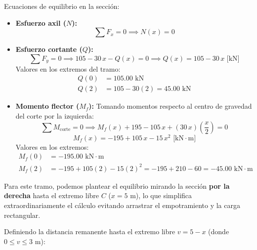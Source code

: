 Ecuaciones de equilibrio en la sección:
\begin{itemize}
    \item \textbf{Esfuerzo axil ($N$):}
          \begin{equation}
              \sum F_x = 0 \implies \boxed{N(x) = 0}
          \end{equation}
    \item \textbf{Esfuerzo cortante ($Q$):}
          \begin{equation}
              \sum F_y = 0 \implies 105 - 30\,x - Q(x) = 0 \implies \boxed{Q(x) = 105 - 30\,x\text{ [kN]}}
          \end{equation}
          Valores en los extremos del tramo:
          \begin{align*}
              Q(0) & = 105.00\text{ kN}              \\
              Q(2) & = 105 - 30(2) = 45.00\text{ kN}
          \end{align*}
    \item \textbf{Momento flector ($M_f$):}
          Tomando momentos respecto al centro de gravedad del corte por la izquierda:
          \begin{equation}
              \sum M_{\text{corte}} = 0 \implies M_f(x) + 195 - 105\,x + (30\,x)\left(\frac{x}{2}\right) = 0
          \end{equation}
          \begin{equation}
              \boxed{M_f(x) = -195 + 105\,x - 15\,x^2\text{ [kN}\cdot\text{m]}}
          \end{equation}
          Valores en los extremos:
          \begin{align*}
              M_f(0) & = -195.00\text{ kN}\cdot\text{m}                                            \\
              M_f(2) & = -195 + 105(2) - 15(2)^2 = -195 + 210 - 60 = -45.00\text{ kN}\cdot\text{m}
          \end{align*}
\end{itemize}


Para este tramo, podemos plantear el equilibrio mirando la sección \textbf{por la derecha} hasta el extremo libre $C$ ($x = 5\text{ m}$), lo que simplifica extraordinariamente el cálculo evitando arrastrar el empotramiento y la carga rectangular.

Definiendo la distancia remanente hasta el extremo libre $v = 5 - x$ (donde $0 \le v \le 3\text{ m}$):

